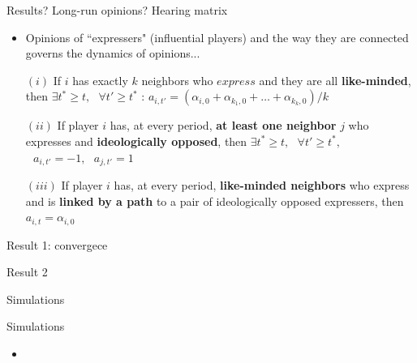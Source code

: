 \documentclass[xcolor=table]{beamer}
\begin{document}
\begin{frame}{Results? Long-run opinions? Hearing matrix}

\begin{itemize}\setlength\itemsep{1em}
	\item Opinions of ``expressers" (influential players) and the way they are connected governs the dynamics of opinions...
\end{itemize}
\begin{tcolorbox}[enhanced,attach boxed title to top center={yshift=-3mm,yshifttext=-1mm}, colback=red!3,colframe=red!40,colbacktitle=red!40, title=Proposition ,fonttitle=\bfseries, boxed title style={size=small,colframe=red!50} ] 

\begin{itemize}
\setlength\itemsep{1em}
	\item[$(i)$]  If $i$ has exactly $k$ neighbors who $express$ and they are all {\bf\color{purple}like-minded}, then $\exists t^* \geq t, \mbox{ }\forall t' \geq t^* $ :
	$ a_{i,t'} = ({\alpha_{i,0} + \alpha_{k_1,0}  + \ldots + \alpha_{k_k,0} })/{k}$
	\item[$(ii)$]  If player $i$ has, at every period, {\bf\color{purple}at least one neighbor} $j$ who expresses and {\bf\color{purple}ideologically opposed}, then $ \exists t^{*} \geq t, \mbox{ }\forall t' \geq t^{*},$ $ \mbox{ } a_{i,t'} = -1, \mbox{ }a_{j,t'} = 1$
	\item[$(iii)$]  If player $i$ has, at every period, {\bf\color{purple}like-minded neighbors} who express and is {\bf\color{purple}linked by a path} to a pair of ideologically opposed expressers, then  $a_{i,t} = \alpha_{i,0}$
\end{itemize}
\end{tcolorbox}
\end{frame}
%
\begin{frame}{Result 1: convergece}

\end{frame}
%
\begin{frame}{Result 2}

\end{frame}
%
\begin{frame}
\begin{tcolorbox}[enhanced,attach boxed title to top center={yshift=-3mm,yshifttext=-1mm}, colback=red!3,colframe=red!40,colbacktitle=red!40 ,fonttitle=\bfseries, boxed title style={size=small,colframe=red!50} ] 
\centering Simulations
\end{tcolorbox}
\end{frame}
\begin{frame}{Simulations}
\begin{itemize} \item
\end{itemize}
\end{frame}
\end{document}
